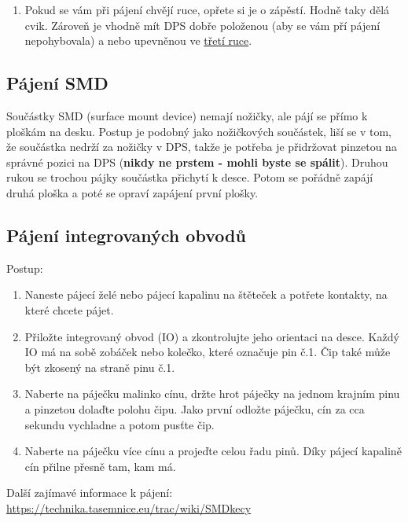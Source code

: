 \begin{enumerate}
\item Pokud se vám při pájení chvějí ruce, opřete si je o zápěstí. Hodně taky dělá cvik.
Zároveň je vhodně mít DPS dobře položenou (aby se vám pří pájení nepohybovala) a nebo upevněnou ve \href{https://www.gme.cz/drzak-treti-ruka-s-lupou-proskit-608-391a}{třetí ruce}.   
	
\end{enumerate}


\subsection{Pájení SMD}  
 

Součástky SMD (surface mount device) nemají nožičky, ale pájí se přímo k ploškám na desku. 
Postup je podobný jako nožičkových součástek, liší se v tom, že součástka nedrží za nožičky v DPS, 
takže je potřeba je přidržovat pinzetou na správné pozici na DPS ({\bf nikdy ne prstem - mohli byste se spálit}). Druhou rukou se trochou 
pájky součástka přichytí k desce. Potom se pořádně zapájí druhá ploška a poté se opraví zapájení první plošky.   

\subsection{Pájení integrovaných obvodů} 

Postup: 
\begin{enumerate}


\item Naneste pájecí želé  nebo pájecí kapalinu na štěteček a potřete kontakty, na které chcete pájet.     
\item Přiložte integrovaný obvod (IO) a zkontrolujte jeho orientaci na desce. Každý IO 
má na sobě zobáček nebo kolečko, které označuje pin č.1. Čip také může být zkosený na straně pinu č.1.
\item Naberte na páječku malinko cínu, držte hrot páječky na jednom krajním pinu a 
pinzetou dolaďte polohu čipu. Jako první odložte páječku, cín za cca sekundu vychladne a potom pusťte čip.  
\item Naberte na páječku více cínu a projeďte celou řadu pinů. Díky pájecí kapalině cín přilne přesně tam, kam má.  

\end{enumerate}
                        
Další zajímavé informace k pájení: \url{https://technika.tasemnice.eu/trac/wiki/SMDkecy}                                                                      
